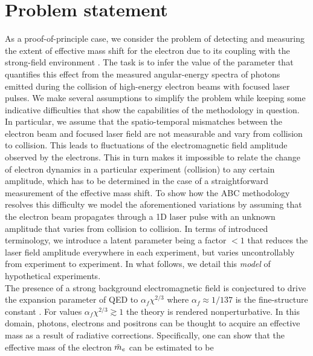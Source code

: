 \documentclass[%
 reprint,
 amsmath,amssymb,
 aps,
]{revtex4-2}
\begin{document}
\section{Problem statement} \label{sec:problemstatement} 
As a proof-of-principle case, we consider the problem of detecting and measuring the extent of effective mass shift for the electron due to its coupling with the strong-field environment \cite{fedotov2022advances,yakimenko2019prospect,ritus1970radiative,meuren2011quantum}. The task is to infer the value of the parameter that quantifies this effect from the measured angular-energy spectra of photons emitted during the collision of high-energy electron beams with focused laser pulses. We make several assumptions to simplify the problem while keeping some indicative difficulties that show the capabilities of the methodology in question. In particular, we assume that the spatio-temporal mismatches between the electron beam and focused laser field are not measurable and vary from collision to collision. This leads to fluctuations of the electromagnetic field amplitude observed by the electrons. This in turn makes it impossible to relate the change of electron dynamics in a particular experiment (collision) to any certain amplitude, which has to be determined in the case of a straightforward measurement of the effective mass shift. To show how the ABC methodology resolves this difficulty we model the aforementioned variations by assuming that the electron beam propagates through a 1D laser pulse with an unknown amplitude that varies from collision to collision. In terms of introduced terminology, we introduce a latent parameter being a factor $< 1$ that reduces the laser field amplitude everywhere in each experiment, but varies uncontrollably from experiment to experiment. In what follows, we detail this \textit{model} of hypothetical experiments. \\


The presence of a strong background electromagnetic field is conjectured to drive the expansion parameter of QED to $\alpha_f \chi^{2/3}$ where $\alpha_f \approx 1/137$ is the fine-structure constant \cite{fedotov2022advances,yakimenko2019prospect,ritus1970radiative,meuren2011quantum}. For values $\alpha_f \chi^{2/3} \gtrsim 1$ the theory is rendered nonperturbative. In this domain, photons, electrons and positrons can be thought to acquire an effective mass as a result of radiative corrections. Specifically, one can show that the effective mass of the electron $\Tilde{m}_e$ can be estimated to be \cite{yakimenko2019prospect}
\end{document}
